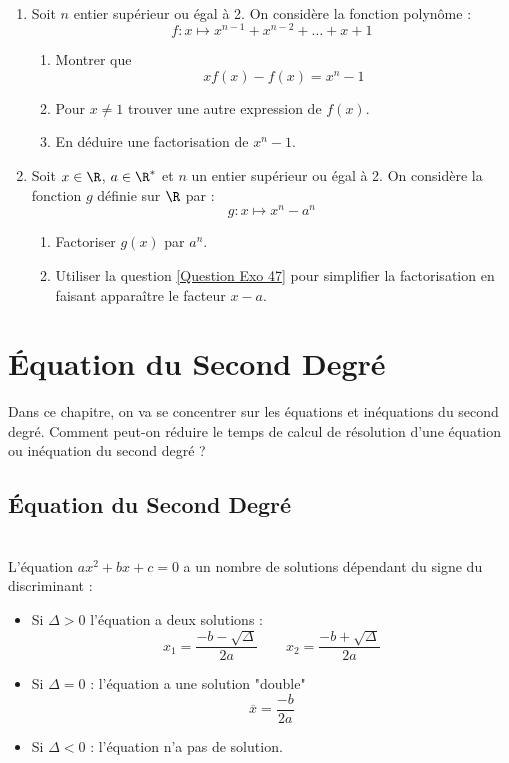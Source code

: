 \documentclass[12pt,fleqn]{report} %
\begin{document}
\begin{exercise}\label{Exercice 47}\text{ }\\
	\begin{enumerate}
		\item Soit $n$ entier supérieur ou égal à 2. On considère la fonction polynôme : 
		\[
		f : x \mapsto x^{n-1} + x^{n-2} + \dots + x + 1
		\] \begin{enumerate}
			\item Montrer que \[
			x f(x) - f(x) = x^n - 1\]
			\item Pour $x \neq 1$ trouver une autre expression de $f(x)$.
			\item \label{Question Exo 47} En déduire une factorisation de $x^n -1$.
		\end{enumerate}
		\item Soit $x\in \R$, $a \in \R^*$ et $n$ un entier supérieur ou égal à 2. On considère la fonction $g$ définie sur $\R$ par : 
		\[
		g: x \mapsto x^n - a^n
		\]
		\begin{enumerate}
			\item Factoriser $g(x)$ par $a^n$.
			\item Utiliser la question \ref{Question Exo 47} pour simplifier la factorisation en faisant apparaître le facteur $x-a$.
		\end{enumerate}
	\end{enumerate}
\end{exercise}



\setcounter{chapter}{4}
\chapter{\'Equation du Second Degré}
Dans ce chapitre, on va se concentrer sur les équations et inéquations du second degré. Comment peut-on réduire le temps de calcul de résolution d'une équation ou inéquation du second degré ?
\section{\'Equation du Second Degré}
\begin{theorem}\text{ }\\
	L'équation $ax^2 + bx + c = 0$ a un nombre de solutions dépendant du signe du discriminant : 
	\begin{itemize}
		\item Si $\Delta >0$ l'équation a deux solutions : \[
		x_1 = \frac{-b - \sqrt{\Delta}}{2a} \qquad x_2 = \frac{-b + \sqrt{\Delta}}{2a}
		\]
		\item Si $\Delta = 0$ : l'équation a une solution "double" \[
		\overline{x} = \frac{-b}{2a}
		\]
		\item Si $\Delta < 0$ : l'équation n'a pas de solution.
	\end{itemize}
\end{theorem}
\end{document}

